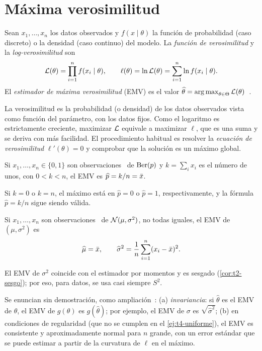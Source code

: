 \section{Máxima verosimilitud}

\begin{definicion}\label{def:t4-emv}
Sean $x_1,\dots,x_n$ los datos observados y $f(x\mid\theta)$ la función de probabilidad (caso discreto) o la densidad (caso continuo) del modelo. La \emph{función de verosimilitud} y la \emph{log-verosimilitud} son
\[
\mathcal{L}(\theta)=\prod_{i=1}^{n}f(x_i\mid\theta),\qquad \ell(\theta)=\ln\mathcal{L}(\theta)=\sum_{i=1}^{n}\ln f(x_i\mid\theta).
\]
El \emph{estimador de máxima verosimilitud} (EMV) es el valor $\widehat\theta=\operatorname*{arg\,max}_{\theta\in\Theta}\mathcal{L}(\theta)$~\cite[cap.~9]{wasserman}.
\end{definicion}

La verosimilitud es la probabilidad (o densidad) de los datos observados vista como función del parámetro, con los datos fijos. Como el logaritmo es estrictamente creciente, maximizar $\mathcal{L}$ equivale a maximizar $\ell$, que es una suma y se deriva con más facilidad. El procedimiento habitual es resolver la \emph{ecuación de verosimilitud} $\ell'(\theta)=0$ y comprobar que la solución es un máximo global.

\begin{teorema}\label{teo:t4-emv-bernoulli}
Si $x_1,\dots,x_n\in\{0,1\}$ son observaciones \iid\ de $\operatorname{Ber}(p)$ y $k=\sum_ix_i$ es el número de unos, con $0<k<n$, el EMV es $\widehat p=k/n=\bar{x}$.
\end{teorema}

Si $k=0$ o $k=n$, el máximo está en $\widehat p=0$ o $\widehat p=1$, respectivamente, y la fórmula $\widehat p=k/n$ sigue siendo válida.

\begin{teorema}\label{teo:t4-emv-normal}
Si $x_1,\dots,x_n$ son observaciones \iid\ de $\mathcal{N}(\mu,\sigma^{2})$, no todas iguales, el EMV de $(\mu,\sigma^{2})$ es
\[
\widehat\mu=\bar{x},\qquad\widehat\sigma^{2}=\frac1n\sum_{i=1}^{n}(x_i-\bar{x})^{2}.
\]
\end{teorema}

El EMV de $\sigma^{2}$ coincide con el estimador por momentos y es sesgado (\cref{cor:t2-sesgo}); por eso, para datos, se usa casi siempre $S^{2}$.

\addtocounter{definicion}{1}%

\begin{observacion}\label{obs:t4-propiedades}
Se enuncian sin demostración, como ampliación~\cite[cap.~9]{wasserman}: (a) \emph{invariancia}: si $\widehat\theta$ es el EMV de $\theta$, el EMV de $g(\theta)$ es $g(\widehat\theta)$; por ejemplo, el EMV de $\sigma$ es $\sqrt{\widehat\sigma^{2}}$; (b) en condiciones de regularidad (que no se cumplen en el \cref{ej:t4-uniforme}), el EMV es consistente y aproximadamente normal para $n$ grande, con un error estándar que se puede estimar a partir de la curvatura de $\ell$ en el máximo.
\end{observacion}

